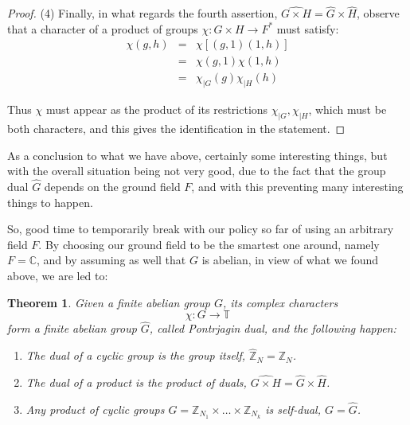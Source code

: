 \documentclass[12pt]{amsbook}
\newtheorem{theorem}{Theorem}[chapter]
\begin{document}
\begin{proof}
\medskip

(4) Finally, in what regards the fourth assertion, $\widehat{G\times H}=\widehat{G}\times\widehat{H}$, observe that a character of a product of groups $\chi:G\times H\to F^*$ must satisfy:
\begin{eqnarray*}
\chi(g,h)
&=&\chi\left[(g,1)(1,h)\right]\\
&=&\chi(g,1)\chi(1,h)\\
&=&\chi_{|G}(g)\chi_{|H}(h)
\end{eqnarray*}

Thus $\chi$ must appear as the product of its restrictions $\chi_{|G},\chi_{|H}$, which must be both characters, and this gives the identification in the statement.
\end{proof}

As a conclusion to what we have above, certainly some interesting things, but with the overall situation being not very good, due to the fact that the group dual $\widehat{G}$ depends on the ground field $F$, and with this preventing many interesting things to happen.

\bigskip

So, good time to temporarily break with our policy so far of using an arbitrary field $F$. By choosing our ground field to be the smartest one around, namely $F=\mathbb C$, and by assuming as well that $G$ is abelian, in view of what we found above, we are led to:


\begin{theorem}
Given a finite abelian group $G$, its complex characters 
$$\chi:G\to\mathbb T$$
form a finite abelian group $\widehat{G}$, called Pontrjagin dual, and the following happen:
\begin{enumerate}
\item The dual of a cyclic group is the group itself, $\widehat{\mathbb Z}_N=\mathbb Z_N$.

\item The dual of a product is the product of duals, $\widehat{G\times H}=\widehat{G}\times\widehat{H}$.

\item Any product of cyclic groups $G=\mathbb Z_{N_1}\times\ldots\times\mathbb Z_{N_k}$ is self-dual, $G=\widehat{G}$.
\end{enumerate}
\end{theorem}
\end{document}
